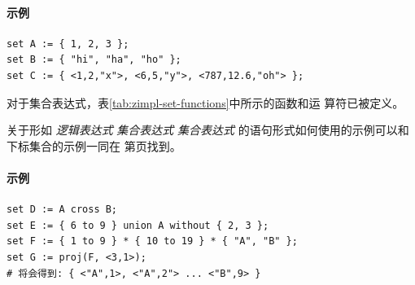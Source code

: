 \paragraph{示例}
{\small
\begin{verbatim}
set A := { 1, 2, 3 };
set B := { "hi", "ha", "ho" };
set C := { <1,2,"x">, <6,5,"y">, <787,12.6,"oh"> };
\end{verbatim}
}
\noindent 对于集合表达式，表\ref{tab:zimpl-set-functions}中所示的函数和运
算符已被定义。

关于形如 \emph{逻辑表达式}  \emph{集合表达式}  
\emph{集合表达式}  的语句形式如何使用的示例可以和下标集合的示例一同在
第\pageref{sec:indexed-sets}页找到。

\paragraph{示例}
{\small
\begin{verbatim}
set D := A cross B;
set E := { 6 to 9 } union A without { 2, 3 };
set F := { 1 to 9 } * { 10 to 19 } * { "A", "B" };
set G := proj(F, <3,1>);
# 将会得到: { <"A",1>, <"A",2"> ... <"B",9> }
\end{verbatim}
}

